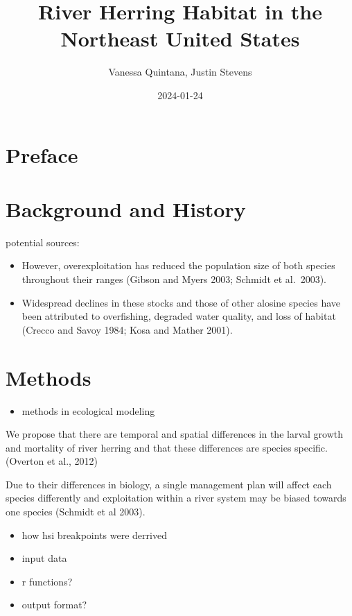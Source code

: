 \documentclass[
]{book}
\title{River Herring Habitat in the Northeast United States}
\author{Vanessa Quintana, Justin Stevens}
\date{2024-01-24}
\providecommand{\tightlist}{%
  \setlength{\itemsep}{0pt}\setlength{\parskip}{0pt}}
\begin{document}
\maketitle

{
\setcounter{tocdepth}{1}
\tableofcontents
}
\hypertarget{preface}{%
\chapter{Preface}\label{preface}}

\hypertarget{background-and-history}{%
\chapter{Background and History}\label{background-and-history}}

potential sources:

\begin{itemize}
\item
  However, overexploitation has reduced the population size of both species throughout their ranges (Gibson and Myers 2003; Schmidt et al.~2003).
\item
  Widespread declines in these stocks and those of other alosine species have been attributed to overfishing, degraded water quality, and loss of habitat (Crecco and Savoy 1984; Kosa and Mather 2001).
\end{itemize}

\hypertarget{cross}{%
\chapter{Methods}\label{cross}}

\begin{itemize}
\tightlist
\item
  methods in ecological modeling
\end{itemize}

We propose that there are temporal and spatial differences in the larval growth and mortality of river herring and that these differences are species specific. (Overton et al., 2012)

Due to their differences in biology, a single management plan will affect each species differently and exploitation within a river system may be biased towards one species (Schmidt et al 2003).

\begin{itemize}
\item
  how hsi breakpoints were derrived
\item
  input data
\item
  r functions?
\item
  output format?
\end{itemize}
\end{document}
